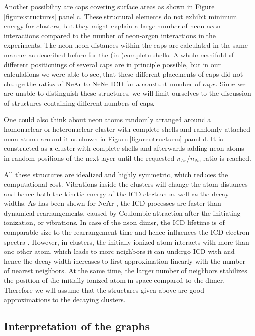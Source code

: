 Another possibility are caps covering surface areas as shown
in Figure \ref{figure:structures} panel c. These structural elements
do not exhibit minimum energy for clusters, but they might explain a
large number of neon-neon interactions compared to the number of
neon-argon interactions in the experiments.
The neon-neon distances within the caps are
calculated in the same
manner as described before for the (in-)complete shells.
A whole manifold of different positionings of several caps are in principle
possible, but in our calculations we were able to see, that these different
placements of caps did not change the ratios of NeAr to NeNe ICD for a
constant number of caps. Since we
are unable to distinguish these structures, we will limit ourselves to the
discussion of structures containing different numbers of caps.

One could also think about neon atoms randomly arranged around a homonuclear
or heteronuclear cluster with complete shells and randomly attached neon
atoms around it as shown in Figure \ref{figure:structures} panel d.
It is constructed as a cluster with complete shells and afterwards adding
neon atoms in random positions of the next layer until the requested
$n_{Ar}/n_{Ne}$ ratio is reached.

All these structures are idealized and highly symmetric, which reduces
the computational cost. Vibrations inside the clusters will change the atom
distances and hence both the kinetic energy of the ICD electron as well as
the decay widths. As has been shown for NeAr \cite{Scheit06}, the ICD processes
are faster than dynamical rearrangements, caused by Coulombic attraction
after the initiating ionization, or vibrations. In case of the neon dimer, the
ICD lifetime is of comparable size to the rearrangement time and hence
influences the ICD electron spectra \cite{Scheit03}. However, in clusters, the
initially ionized atom interacts with more than one other atom, which leads
to more neighbors it can undergo ICD with and hence the decay width increases
to first approximation linearly with the number of nearest neighbors.
At the same time, the larger number of neighbors stabilizes the position
of the initially ionized atom in space compared to the dimer.
Therefore we will assume that the structures given above are good
approximations to the decaying clusters.




\subsection{Interpretation of the graphs}

